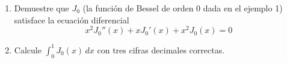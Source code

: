 \item 
    \begin{enumerate}
        \item[(a)] Demuestre que $J_0$ (la función de Bessel de orden 0 dada en el ejemplo 1) satisface la ecuación diferencial
        \[ x^2 J_0''(x) + x J_0'(x) + x^2 J_0(x) = 0 \]
        \item[(b)] Calcule $\int_0^1 J_0(x) \, dx$ con tres cifras decimales correctas.
    \end{enumerate}
